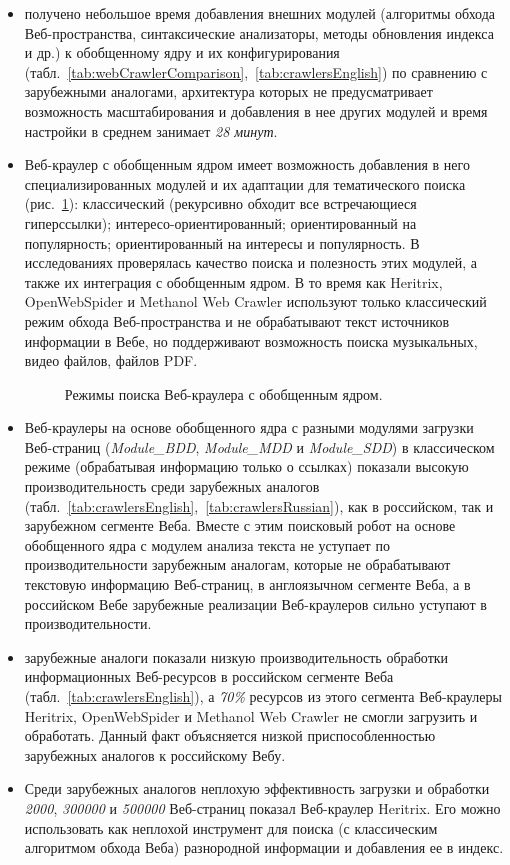 \begin{itemize}
	\item получено небольшое время добавления внешних модулей (алгоритмы обхода Веб-пространства, синтаксические анализаторы, методы обновления индекса и др.) к обобщенному ядру и их конфигурирования (табл.~\cref{tab:webCrawlerComparison},~\cref{tab:crawlersEnglish}) по сравнению с зарубежными аналогами, архитектура которых не предусматривает возможность масштабирования и добавления в нее других модулей и время настройки в среднем занимает \textit{28 минут}.
	\item Веб-краулер с обобщенным ядром имеет возможность добавления в него специализированных модулей и их адаптации для тематического поиска (рис.~\cref{fig:crawlerModes}): классический (рекурсивно обходит все встречающиеся гиперссылки); интересо-ориентированный; ориентированный на популярность; ориентированный на интересы и популярность. В исследованиях \cite{BlekanovBondarenko1,BlekanovBondarenko2} проверялась качество поиска и полезность этих модулей, а также их интеграция с обобщенным ядром. В то время как Heritrix, OpenWebSpider и Methanol Web Crawler используют только классический режим обхода Веб-пространства и не обрабатывают текст источников информации в Вебе, но поддерживают возможность поиска музыкальных, видео файлов, файлов PDF.
	
	\begin{figure}[ht]
		\caption{Режимы поиска Веб-краулера с обобщенным ядром.}\label{fig:crawlerModes}
	\end{figure}
	
	\item Веб-краулеры на основе обобщенного ядра с разными модулями загрузки Веб-страниц (\textit{Module\_BDD}, \textit{Module\_MDD} и \textit{Module\_SDD}) в классическом режиме (обрабатывая информацию только о ссылках) показали высокую производительность среди зарубежных аналогов (табл.~\cref{tab:crawlersEnglish},~\cref{tab:crawlersRussian}), как в российском, так и зарубежном сегменте Веба. Вместе с этим поисковый робот на основе обобщенного ядра с модулем анализа текста не уступает по производительности зарубежным аналогам, которые не обрабатывают текстовую информацию Веб-страниц, в англоязычном сегменте Веба, а в российском Вебе зарубежные реализации Веб-краулеров сильно уступают в производительности. 
	\item зарубежные аналоги показали низкую производительность обработки информационных Веб-ресурсов в российском сегменте Веба (табл.~\cref{tab:crawlersEnglish}), а \textit{70\%} ресурсов из этого сегмента Веб-краулеры Heritrix, OpenWebSpider и Methanol Web Crawler не смогли загрузить и обработать. Данный факт объясняется низкой приспособленностью зарубежных аналогов к российскому Вебу.
	\item Среди зарубежных аналогов неплохую эффективность загрузки и обработки \textit{2000}, \textit{300000} и \textit{500000} Веб-страниц показал Веб-краулер Heritrix. Его можно использовать как неплохой инструмент для поиска (с классическим алгоритмом обхода Веба) разнородной информации и добавления ее в индекс.
\end{itemize}

